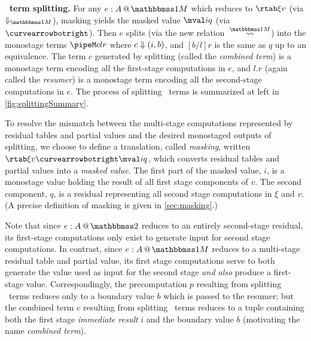 \begin{abstrsyn}
\textbf{\bbonem\ term splitting.}  For any $\colmix e A$ which reduces
to $\rtab \xi v$ (via $\redonesym$), masking yields the masked value
$\mval i q$ (via~$\vsplito$).  Then $e$ splits (via the new
relation~$\splitonesym$) into the monostage terms $\pipeM c l r$ where
${c} \Downarrow {(}i,b)$, and $[b/l]r$ is the same as $q$ up to an
equivalence.  The term $c$ generated by splitting (called the {\em
  combined term}) is a monostage term encoding all the first-stage
computations in $e$, and $l.r$ (again called the {\em resumer}) is a
monostage term encoding all the second-stage computations in $e$.  The
process of splitting \bbonem\ terms is summarized at left in
\ref{fig:splittingSummary}.


To resolve the mismatch between the multi-stage computations
represented by residual tables and partial values and the desired
monostaged outputs of splitting, we choose to define a translation,
called {\em masking}, written $\rtab \xi v \vsplito \mval i q$, which
converts residual tables and partial values into a {\em masked value}.
The first part of the masked value, $i$, is a monostage value holding
the result of all first stage components of $v$.  The second
component, $q$, is a residual representing all second stage
computations in $\xi$ and $v$. (A precise definition of masking is
given in \ref{sec:masking}.)


Note that since $\coltwo e A$ reduces to an entirely second-stage
residual, its first-stage computations only exist to generate input
for second stage computations.  In contrast, since $\colmix e A$
reduces to a multi-stage residual table and partial value, its first
stage computations serve to both generate the value used as input for
the second stage {\em and also} produce a first-stage value.
Correspondingly, the precomputation $p$ resulting from splitting
\bbtwo\ terms reduces only to a boundary value $b$ which is passed to
the resumer; but the combined term $c$ resulting from splitting
\bbonem\ terms reduces to a tuple containing both the first stage {\em
  immediate result} $i$ and the boundary value $b$ (motivating the
name {\em combined term}). 


\end{abstrsyn}

